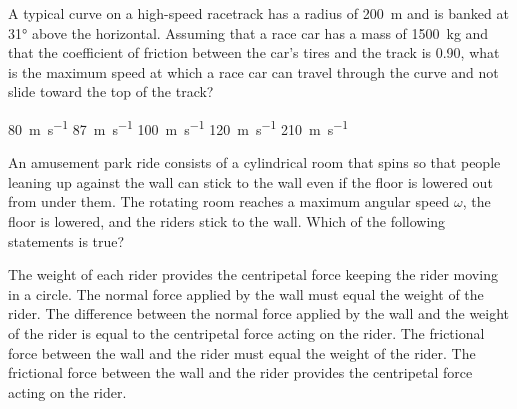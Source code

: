 \documentclass{../../oss-apphys-exam}
\begin{document}
\begin{multicols*}{2}
\begin{questions}
    \question A typical curve on a high-speed racetrack has a radius of
    \SI{200}{\metre} and is banked at \ang{31} above the horizontal. Assuming
    that a race car has a mass of \SI{1500}{\kilo\gram} and that the
    coefficient of friction between the car's tires and the track is 0.90, what
    is the maximum speed at which a race car can travel through the curve and
    not slide toward the top of the track?
    \begin{choices}
      \choice\SI{80}{\metre\per\second}
      \choice\SI{87}{\metre\per\second}
      \choice\SI{100}{\metre\per\second}
      \choice\SI{120}{\metre\per\second}
      \choice\SI{210}{\metre\per\second}
    \end{choices}
    
    
    \question An amusement park ride consists of a cylindrical room that spins
    so that people leaning up against the wall can stick to the wall even if the
    floor is lowered out from under them. The rotating room reaches a maximum
    angular speed $\omega$, the floor is lowered, and the riders stick to
    the wall. Which of the following statements is true?
    \begin{choices}
      \choice The weight of each rider provides the centripetal force keeping
      the rider moving in a circle.
      \choice The normal force applied by the wall must equal the weight of the
      rider.
      \choice The difference between the normal force applied by the wall and
      the weight of the rider is equal to the centripetal force acting on the
      rider.
      \choice The frictional force between the wall and the rider must equal the
      weight of the rider.
      \choice The frictional force between the wall and the rider provides the
      centripetal force acting on the rider.
    \end{choices}
    \columnbreak

\end{questions}
\end{multicols*}
\end{document}
